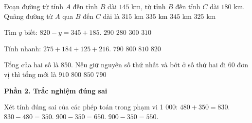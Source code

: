 \begin{ex} %
Đoạn đường từ tỉnh $A$ đến tỉnh $B$ dài $145\text{ km}$, từ tỉnh $B$ đến tỉnh $C$ dài $180\text{ km}$. Quãng đường từ $A$ qua $B$ đến $C$ dài là
\choice
{$315\text{ km}$}
{$335\text{ km}$}
{$345\text{ km}$}
{\True $325\text{ km}$}
\end{ex}

\begin{ex} %
Tìm $y$ biết: $820 - y = 345 + 185$.
\choice
{\True $290$}
{$280$}
{$300$}
{$310$}
\end{ex}

\begin{ex} %
Tính nhanh: $275 + 184 + 125 + 216$.
\choice
{$790$}
{\True $800$}
{$810$}
{$820$}
\end{ex}

\begin{ex} %
Tổng của hai số là 850. Nếu giữ nguyên số thứ nhất và bớt ở số thứ hai đi 60 đơn vị thì tổng mới là
\choice
{$910$}
{$800$}
{$850$}
{\True $790$}
\end{ex}

\textbf{Phần 2. Trắc nghiệm đúng sai}

\begin{ex} %
Xét tính đúng sai của các phép toán trong phạm vi 1 000:
\choiceTF
{\True $480 + 350 = 830$.}
{\True $830 - 480 = 350$.}
{$900 - 350 = 650$.}
{\True $900 - 350 = 550$.}
\end{ex}

